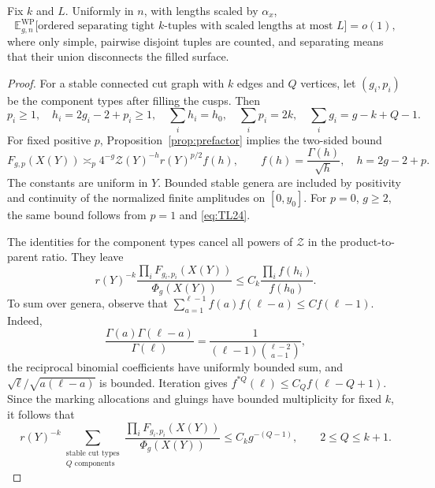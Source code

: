 \begin{lemma}\label{lem:tight-separating}
Fix $k$ and $L$. Uniformly in $n$, with lengths scaled by $\alpha_x$,
\begin{equation}
 \mathbb E^{\mathrm{WP}}_{g,n}
 \bigl[\text{ordered separating tight $k$-tuples with scaled
 lengths at most $L$}\bigr]=o(1),
 \label{eq:tight-separating-count}
\end{equation}
where only simple, pairwise disjoint tuples are counted, and separating
means that their union disconnects the filled surface.
\end{lemma}

\begin{proof}
For a stable connected cut graph with $k$ edges and $Q$ vertices, let
$(g_i,p_i)$ be the component types after filling the cusps. Then
\[
 p_i\ge1,\quad h_i=2g_i-2+p_i\ge1,\quad
 \sum_i h_i=h_0,\quad \sum_i p_i=2k,\quad
 \sum_i g_i=g-k+Q-1.
\]
For fixed positive $p$, Proposition~\ref{prop:prefactor} implies the
two-sided bound
\begin{equation}
 F_{g,p}(X(Y))\asymp_p
 4^{-g}\mathcal Z(Y)^{-h}r(Y)^{p/2}f(h),
 \qquad f(h)=\frac{\Gamma(h)}{\sqrt h},\quad h=2g-2+p.
 \label{eq:tight-gamma}
\end{equation}
The constants are uniform in $Y$. Bounded stable genera are included
by positivity and continuity of the normalized finite amplitudes on
$[0,y_0]$. For $p=0$, $g\ge2$, the same bound follows from $p=1$
and \eqref{eq:TL24}.

The identities for the component types cancel all powers of
$\mathcal Z$ in the product-to-parent ratio. They leave
\[
 r(Y)^{-k}\frac{\prod_i F_{g_i,p_i}(X(Y))}{\Phi_g(X(Y))}
 \le C_k\frac{\prod_i f(h_i)}{f(h_0)}.
\]
To sum over genera, observe that
$\sum_{a=1}^{\ell-1}f(a)f(\ell-a)\le C f(\ell-1)$.
Indeed,
\[
 \frac{\Gamma(a)\Gamma(\ell-a)}{\Gamma(\ell)}
 =\frac{1}{(\ell-1)\binom{\ell-2}{a-1}},
\]
the reciprocal binomial coefficients have uniformly bounded sum,
and $\sqrt{\ell}/\sqrt{a(\ell-a)}$ is bounded. Iteration gives
$f^{*Q}(\ell)\le C_Q f(\ell-Q+1)$. Since the marking allocations and
gluings have bounded multiplicity for fixed $k$, it follows that
\begin{equation}
 r(Y)^{-k}\sum_{\substack{\text{stable cut types}\\Q\text{ components}}}
 \frac{\prod_i F_{g_i,p_i}(X(Y))}{\Phi_g(X(Y))}
 \le C_k g^{-(Q-1)},\qquad 2\le Q\le k+1.
 \label{eq:tight-separating-real}
\end{equation}


\end{proof}
